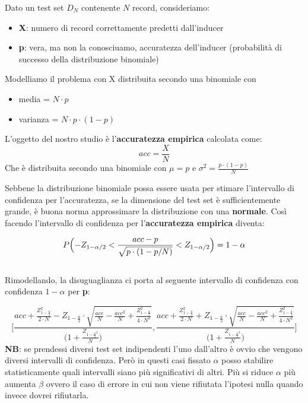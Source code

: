 Dato un test set $D_N$ contenente $N$ record, consideriamo:
\begin{itemize}
	\item \textbf{X}: numero di record correttamente predetti dall'inducer
	\item \textbf{p}: vera, ma non la conosciuamo, accuratezza dell'inducer (probabilità di successo della distribuzione binomiale)
\end{itemize}
Modelliamo il problema con X distribuita secondo una binomiale con
\begin{itemize}
	\item media = $N \cdot p$
	\item varianza = $N \cdot p \cdot (1-p)$
\end{itemize}
L'oggetto del nostro studio è l'\textbf{accuratezza empirica} calcolata come:
 \[acc = \frac{X}{N} \] 
Che è distribuita secondo una binomiale con $\mu = p$ e $\sigma^2 = \frac{p \cdot (1-p)}{N}$

Sebbene la distribuzione binomiale possa essere usata per stimare l'intervallo di confidenza per l'accuratezza, se la dimensione del test set è sufficientemente grande, è buona norma approssimare la distribuzione con una \textbf{normale}. Così facendo l'intervallo di confidenza per l'\textbf{accuratezza empirica} diventa:

\[ P \Bigl( -Z_{1-\alpha/2} < \frac{acc - p}{\sqrt{p \cdot (1-p / N)}} < Z_{1 - \alpha/2} \Bigr) = 1 - \alpha \]\\

Rimodellando, la disuguaglianza ci porta al seguente intervallo di confidenza con confidenza $1-\alpha$ per \textbf{p}:

\[ \Biggl[ \frac{acc + \frac{Z_{1-\frac{a}{2}}^2 }{2 \cdot N} - Z_{1-\frac{a}{2}} \cdot \sqrt{\frac{acc}{N} - \frac{acc^2}{N} + \frac{Z_{1-\frac{a}{2}}^2}{4 \cdot N^2}}}{\bigl(1 + \frac{Z_{1-\frac{a}{2}^2}}{N}\bigr)}
, 
\frac{acc + \frac{Z_{1-\frac{a}{2}}^2 }{2 \cdot N} + Z_{1-\frac{a}{2}} \cdot \sqrt{\frac{acc}{N} - \frac{acc^2}{N} + \frac{Z_{1-\frac{a}{2}}^2}{4 \cdot N^2}}}{\bigl(1 + \frac{Z_{1-\frac{a}{2}^2}}{N}\bigr)} \Biggr] \]
\textbf{NB}: se prendessi diversi test set indipendenti l'uno dall'altro è ovvio che vengono diversi intervalli di confidenza. Però in questi casi fissato $\alpha$ posso stabilire statisticamente quali intervalli siano più significativi di altri. Più si  riduce $\alpha$ più aumenta $\beta$ ovvero il caso di errore in cui non viene rifiutata l'ipotesi nulla quando invece dovrei rifiutarla.

